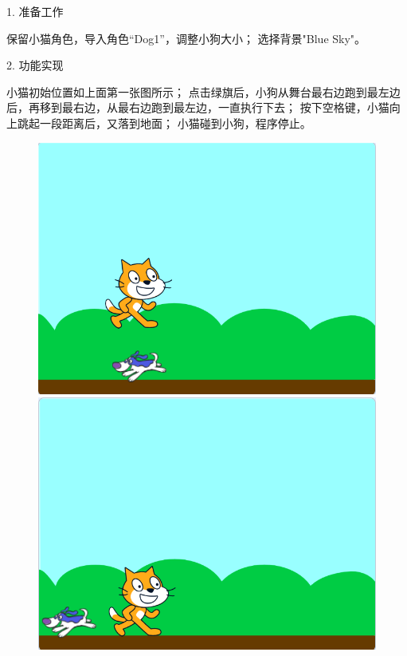 \documentclass[10pt, a4paper]{article}
\begin{document}
\begin{enumerate}
        1. 准备工作
        \begin{tasks}[label = (\arabic*)]
            \task 保留小猫角色，导入角色“Dog1”，调整小狗大小；
            \task 选择背景"Blue Sky"。
        \end{tasks}
        2. 功能实现
        \begin{tasks}[label = (\arabic*)]
            \task 小猫初始位置如上面第一张图所示；
            \task 点击绿旗后，小狗从舞台最右边跑到最左边后，再移到最右边，从最右边跑到最左边，一直执行下去；
            \task 按下空格键，小猫向上跳起一段距离后，又落到地面；
            \task 小猫碰到小狗，程序停止。
        \end{tasks}
        \begin{figure}[htbp]
            \centering
            \begin{minipage}[t]{.24\textwidth}
                \centering
                \includegraphics[width=\textwidth]{37-1.png}
            \end{minipage}
            \begin{minipage}[t]{.24\textwidth}
                \centering
                \includegraphics[width=\textwidth]{37-2.png}

\end{minipage}
\end{figure}
\end{enumerate}
\end{document}
